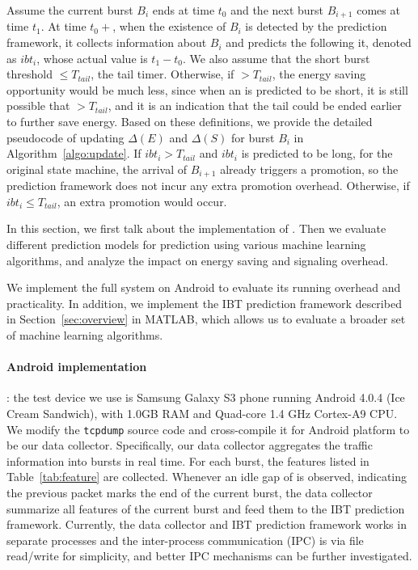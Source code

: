Assume the current burst $B_{i}$ ends at time $t_{0}$ and the next burst $B_{i+1}$ comes at time $t_{1}$. At time $t_{0}+$\BT, when the existence of $B_{i}$ is detected by the prediction framework, it collects information about $B_{i}$ and predicts the \IBT following it, denoted as $ibt_{i}$, whose actual value is $t_{1}-t_{0}$. We also assume that the short burst threshold \SBT $\leq T_{tail}$, the tail timer. Otherwise, if \SBT $> T_{tail}$, the energy saving opportunity would be much less, since when an \IBT is predicted to be short, it is still possible that \IBT $> T_{tail}$, and it is an indication that the tail could be ended earlier to further save energy. Based on these definitions, we provide the detailed pseudocode of updating $\Delta(E)$ and $\Delta(S)$ for burst $B_{i}$ in Algorithm~\ref{algo:update}. If $ibt_{i} > T_{tail}$ and $ibt_{i}$ is predicted to be long, for the original state machine, the arrival of $B_{i+1}$ already triggers a promotion, so the prediction framework does not incur any extra promotion overhead. Otherwise, if $ibt_{i} \leq T_{tail}$, an extra promotion would occur.

\label{sec:evaluation}

In this section, we first talk about the implementation of \NAME. Then we evaluate different prediction models for \IBT prediction using various machine learning algorithms, and analyze the impact on energy saving and signaling overhead. 

\label{sec:implementation}

We implement the full \NAME system on Android to evaluate its running overhead and practicality. In addition, we implement the IBT prediction framework described in Section~\ref{sec:overview} in MATLAB, which allows us to evaluate a broader set of machine learning algorithms.

\paragraph{Android implementation}: the test device we use is Samsung Galaxy S3 phone running Android 4.0.4 (Ice Cream Sandwich), with 1.0GB RAM and Quad-core 1.4 GHz Cortex-A9 CPU. We modify the \texttt{tcpdump} source code and cross-compile it for Android platform to be our data collector. Specifically, our data collector aggregates the traffic information into bursts in real time. For each burst, the features listed in Table~\ref{tab:feature} are collected. Whenever an idle gap of \BT is observed, indicating the previous packet marks the end of the current burst, the data collector summarize all features of the current burst and feed them to the IBT prediction framework. Currently, the data collector and IBT prediction framework works in separate processes and the inter-process communication (IPC) is via file read/write for simplicity, and better IPC mechanisms can be further investigated.

